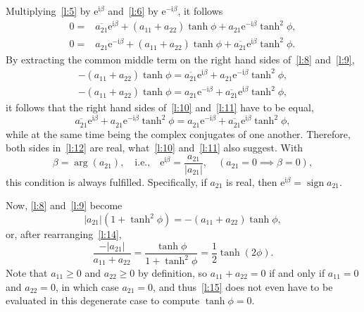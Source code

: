 \documentclass[a4paper,12pt,twoside]{article}
\begin{document}
Multiplying~\eqref{l:5} by $\mathrm{e}^{\mathrm{i}\beta}$
and~\eqref{l:6} by $\mathrm{e}^{-\mathrm{i}\beta}$, it follows
\begin{eqnarray}
  0=&\overline{a_{21}^{}}\mathrm{e}^{\mathrm{i}\beta}+(a_{11}^{}+a_{22}^{})\tanh\phi+a_{21}^{}\mathrm{e}^{-\mathrm{i}\beta}\tanh^2\phi,\label{l:8}\\
  0=&a_{21}^{}\mathrm{e}^{-\mathrm{i}\beta}+(a_{11}^{}+a_{22}^{})\tanh\phi+\overline{a_{21}^{}}\mathrm{e}^{\mathrm{i}\beta}\tanh^2\phi.\label{l:9}
\end{eqnarray}
By extracting the common middle term on the right hand sides of~\eqref{l:8} and~\eqref{l:9},
\begin{eqnarray}
  -(a_{11}^{}+a_{22}^{})\tanh\phi=\overline{a_{21}^{}}\mathrm{e}^{\mathrm{i}\beta}+a_{21}^{}\mathrm{e}^{-\mathrm{i}\beta}\tanh^2\phi,\label{l:10}\\
  -(a_{11}^{}+a_{22}^{})\tanh\phi=a_{21}^{}\mathrm{e}^{-\mathrm{i}\beta}+\overline{a_{21}^{}}\mathrm{e}^{\mathrm{i}\beta}\tanh^2\phi,\label{l:11}
\end{eqnarray}
it follows that the right hand sides of~\eqref{l:10} and~\eqref{l:11}
have to be equal,
\begin{equation}
  \overline{a_{21}^{}}\mathrm{e}^{\mathrm{i}\beta}+a_{21}^{}\mathrm{e}^{-\mathrm{i}\beta}\tanh^2\phi=a_{21}^{}\mathrm{e}^{-\mathrm{i}\beta}+\overline{a_{21}^{}}\mathrm{e}^{\mathrm{i}\beta}\tanh^2\phi,
  \label{l:12}
\end{equation}
while at the same time being the complex conjugates of one another.
Therefore, both sides in~\eqref{l:12} are real, what~\eqref{l:10}
and~\eqref{l:11} also suggest.  With
\begin{equation}
  \beta=\arg(a_{21}),\quad\text{i.e.,}\quad\mathrm{e}^{\mathrm{i}\beta}=\frac{a_{21}}{|a_{21}|},\quad(a_{21}=0\implies\beta=0),
  \label{l:13}
\end{equation}
this condition is always fulfilled.  Specifically, if $a_{21}$ is
real, then $\mathrm{e}^{\mathrm{i}\beta}=\mathop{\mathrm{sign}}{a_{21}}$.

Now, \eqref{l:8} and~\eqref{l:9} become
\begin{equation}
  |a_{21}|(1+\tanh^2\phi)=-(a_{11}+a_{22})\tanh\phi,
  \label{l:14}
\end{equation}
or, after rearranging~\eqref{l:14},
\begin{equation}
  \frac{-|a_{21}|}{a_{11}+a_{22}}=\frac{\tanh\phi}{1+\tanh^2\phi}=\frac{1}{2}\tanh(2\phi).
  \label{l:15}
\end{equation}
Note that $a_{11}\ge 0$ and $a_{22}\ge 0$ by definition, so
$a_{11}+a_{22}=0$ if and only if $a_{11}=0$ and $a_{22}=0$, in which
case $a_{21}=0$, and thus~\eqref{l:15} does not even have to be
evaluated in this degenerate case to compute $\tanh\phi=0$.
\end{document}
